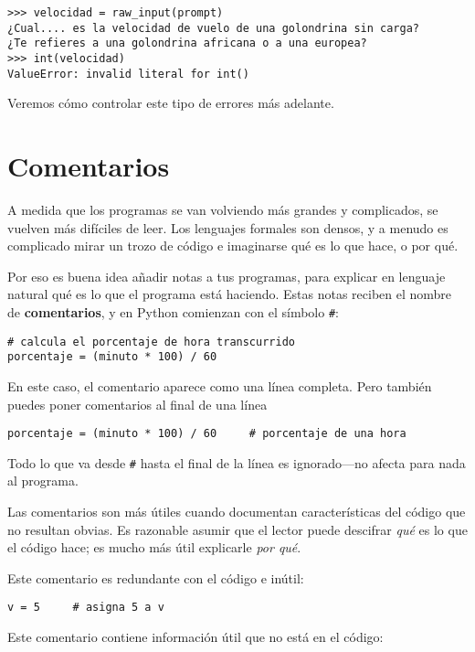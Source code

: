 \beforeverb
\begin{verbatim}
>>> velocidad = raw_input(prompt)
¿Cual.... es la velocidad de vuelo de una golondrina sin carga?
¿Te refieres a una golondrina africana o a una europea?
>>> int(velocidad)
ValueError: invalid literal for int()
\end{verbatim}
\afterverb
%
Veremos cómo controlar este tipo de errores más adelante.



\section{Comentarios}

A medida que los programas se van volviendo más grandes y complicados, se vuelven más difíciles
de leer. Los lenguajes formales son densos, y a menudo es complicado
mirar un trozo de código e imaginarse qué es lo que hace, o por qué.

Por eso es buena idea añadir notas a tus programas, para explicar
en lenguaje natural qué es lo que el programa está haciendo. Estas notas reciben el nombre de
{\bf comentarios}, y en Python comienzan con el símbolo \verb"#":


\beforeverb
\begin{verbatim}
# calcula el porcentaje de hora transcurrido
porcentaje = (minuto * 100) / 60
\end{verbatim}
\afterverb
%
En este caso, el comentario aparece como una línea completa. Pero también puedes
poner comentarios al final de una línea

\beforeverb
\begin{verbatim}
porcentaje = (minuto * 100) / 60     # porcentaje de una hora
\end{verbatim}
\afterverb
%
Todo lo que va desde {\tt \#} hasta el final de la línea es ignorado---no
afecta para nada al programa.

Las comentarios son más útiles cuando documentan características del código
que no resultan obvias. Es razonable asumir que el lector puede descifrar
\emph{qué} es lo que el código hace; es mucho más útil explicarle \emph{por qué}.

Este comentario es redundante con el código e inútil:

\beforeverb
\begin{verbatim}
v = 5     # asigna 5 a v
\end{verbatim}
\afterverb
%
Este comentario contiene información útil que no está en el código:

